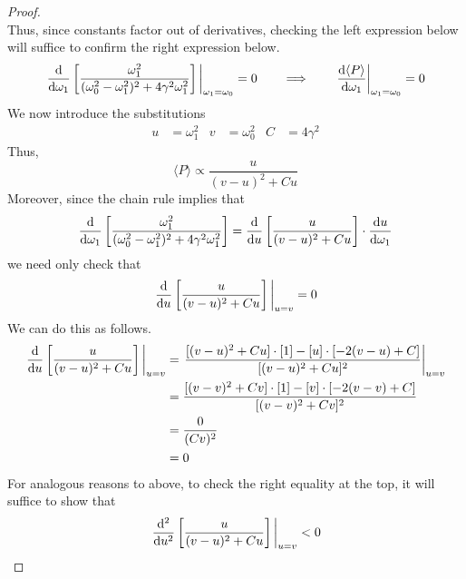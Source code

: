 \documentclass[../psets.tex]{subfiles}
\begin{document}
\begin{enumerate}
\begin{enumerate}
\begin{proof}
\begin{equation*}
            \end{equation*}
            Thus, since constants factor out of derivatives, checking the left expression below will suffice to confirm the right expression below.
            \begin{equation*}
                \eval{\dv{\omega_1}\left[ \frac{\omega_1^2}{(\omega_0^2-\omega_1^2)^2+4\gamma^2\omega_1^2} \right]}_{\omega_1=\omega_0} = 0
                \qquad\Longrightarrow\qquad
                \eval{\dv{\langle P\rangle}{\omega_1}}_{\omega_1=\omega_0} = 0
            \end{equation*}
            We now introduce the substitutions
            \begin{align*}
                u &= \omega_1^2&
                v &= \omega_0^2&
                C &= 4\gamma^2
            \end{align*}
            Thus,
            \begin{equation*}
                \langle P\rangle \propto \frac{u}{(v-u)^2+Cu}
            \end{equation*}
            Moreover, since the chain rule implies that
            \begin{equation*}
                \dv{\omega_1}\left[ \frac{\omega_1^2}{(\omega_0^2-\omega_1^2)^2+4\gamma^2\omega_1^2} \right] = \dv{u}\left[ \frac{u}{(v-u)^2+Cu} \right]\cdot\dv{u}{\omega_1}
            \end{equation*}
            we need only check that
            \begin{equation*}
                \eval{\dv{u}\left[ \frac{u}{(v-u)^2+Cu} \right]}_{u=v} = 0
            \end{equation*}
            We can do this as follows.
            \begin{align*}
                \eval{\dv{u}\left[ \frac{u}{(v-u)^2+Cu} \right]}_{u=v} &= \eval{\frac{[(v-u)^2+Cu]\cdot[1]-[u]\cdot[-2(v-u)+C]}{[(v-u)^2+Cu]^2}}_{u=v}\\
                &= \frac{[(v-v)^2+Cv]\cdot[1]-[v]\cdot[-2(v-v)+C]}{[(v-v)^2+Cv]^2}\\
                &= \frac{0}{(Cv)^2}\\
                &= 0
            \end{align*}
            For analogous reasons to above, to check the right equality at the top, it will suffice to show that
            \begin{equation*}
                \eval{\dv[2]{u}\left[ \frac{u}{(v-u)^2+Cu} \right]}_{u=v} < 0
            \end{equation*}

\end{proof}
\end{enumerate}
\end{enumerate}
\end{document}
